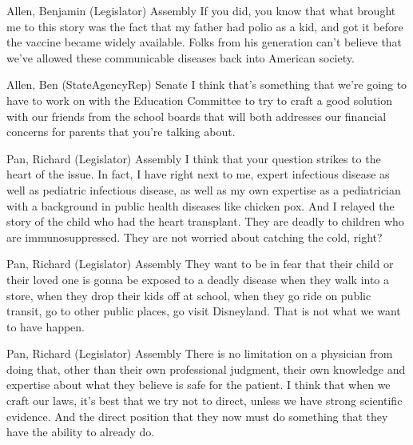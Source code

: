 \begin{result}{22.986796991743105}{Allen, Benjamin (Legislator) Assembly}
If you did, you know that what brought me to this story was the fact that my father had polio as a kid, and got it before the vaccine became widely available. Folks from his generation can't believe that we've allowed these communicable diseases back into American society.
\end{result}

\begin{result}{21.418011287112655}{Allen, Ben (StateAgencyRep) Senate}
I think that's something that we're going to have to work on with the Education Committee to try to craft a good solution with our friends from the school boards that will both addresses our financial concerns for parents that you're talking about.
\end{result}

\begin{result}{21.35821467691213}{Pan, Richard (Legislator) Assembly}
I think that your question strikes to the heart of the issue. In fact, I have right next to me, expert infectious disease as well as pediatric infectious disease, as well as my own expertise as a pediatrician with a background in public health diseases like chicken pox. And I relayed the story of the child who had the heart transplant. They are deadly to children who are immunosuppressed. They are not worried about catching the cold, right?
\end{result}

\begin{result}{20.625675994000698}{Pan, Richard (Legislator) Assembly}
They want to be in fear that their child or their loved one is gonna be exposed to a deadly disease when they walk into a store, when they drop their kids off at school, when they go ride on public transit, go to other public places, go visit Disneyland. That is not what we want to have happen.
\end{result}

\begin{result}{20.50686581315504}{Pan, Richard (Legislator) Assembly}
There is no limitation on a physician from doing that, other than their own professional judgment, their own knowledge and expertise about what they believe is safe for the patient. I think that when we craft our laws, it's best that we try not to direct, unless we have strong scientific evidence. And the direct position that they now must do something that they have the ability to already do.
\end{result}

